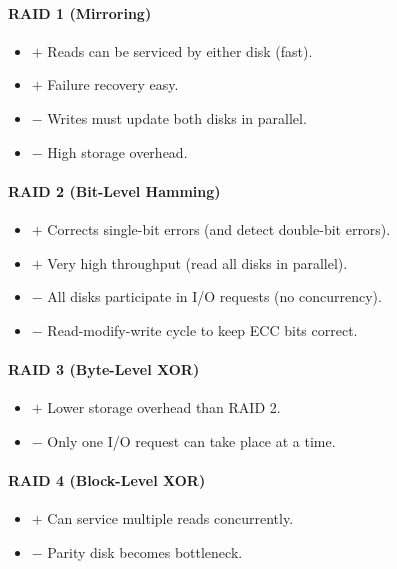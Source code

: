 \documentclass[twocolumn,english]{article}
\begin{document}
\paragraph{RAID 1 (Mirroring)}
\begin{itemize}
\item $+$ Reads can be serviced by either disk (fast). 
\item $+$ Failure recovery easy. 
\item $-$ Writes must update both disks in parallel. 
\item $-$ High storage overhead. 
\end{itemize}

\paragraph{RAID 2 (Bit-Level Hamming)}
\begin{itemize}
\item $+$ Corrects single-bit errors (and detect double-bit errors). 
\item $+$ Very high throughput (read all disks in parallel). 
\item $-$ All disks participate in I/O requests (no concurrency). 
\item $-$ Read-modify-write cycle to keep ECC bits correct. 
\end{itemize}

\paragraph{RAID 3 (Byte-Level XOR)}
\begin{itemize}
\item $+$ Lower storage overhead than RAID 2. 
\item $-$ Only one I/O request can take place at a time. 
\end{itemize}

\paragraph{RAID 4 (Block-Level XOR)}
\begin{itemize}
\item $+$ Can service multiple reads concurrently. 
\item $-$ Parity disk becomes bottleneck. 
\end{itemize}
\end{document}
